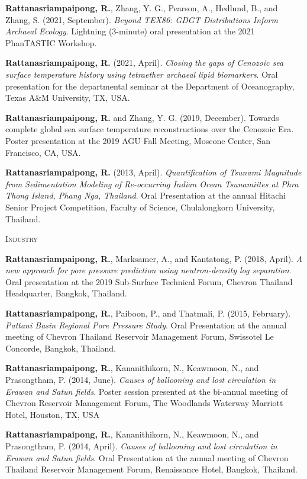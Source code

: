 \documentclass[10pt, letter]{article}
\newcommand{\myname}[1]{\textbf{Rattanasriampaipong, R.}}
\begin{document}
\begin{etaremune}
\item {\myname{rattanasriampaipong}}, Zhang, Y. G., Pearson, A., Hedlund, B., and Zhang, S. (2021, September). \textit{Beyond TEX86: GDGT Distributions Inform Archaeal Ecology}. Lightning (3-minute) oral presentation at the 2021 PhanTASTIC Workshop.

\item {\myname{rattanasriampaipong}} (2021, April). \textit{Closing the gaps of Cenozoic sea surface temperature history using tetraether archaeal lipid biomarkers}. Oral presentation for the departmental seminar at the Department of Oceanography, Texas A\&M University, TX, USA.

\item {\myname{rattanasriampaipong}} and Zhang, Y. G. (2019, December). Towards complete global sea surface temperature reconstructions over the Cenozoic Era. Poster presentation at the 2019 AGU Fall Meeting, Moscone Center, San Francisco, CA, USA.

\item {\myname{rattanasriampaipong}} (2013, April). \textit{Quantification of Tsunami Magnitude from Sedimentation Modeling of Re-occurring Indian Ocean Tsunamiites at Phra Thong Island, Phang Nga, Thailand}. Oral Presentation at the annual Hitachi Senior Project Competition, Faculty of Science, Chulalongkorn University, Thailand.
\end{etaremune}

\bigskip
\textsc{Industry}
\begin{etaremune}
\item {\myname{rattanasriampaipong}},  Marksamer, A., and Kantatong, P. (2018, April). \textit{A new approach for pore pressure prediction using neutron-density log separation}. Oral presentation at the 2019 Sub-Surface Technical Forum, Chevron Thailand Headquarter, Bangkok, Thailand.

\item {\myname{rattanasriampaipong}}, Paiboon, P., and Thatmali, P. (2015, February). \textit{Pattani Basin Regional Pore Pressure Study}. Oral Presentation at the annual meeting of Chevron Thailand Reservoir Management Forum, Swissotel Le Concorde, Bangkok, Thailand.

\item {\myname{rattanasriampaipong}}, Kananithikorn, N., Keawmoon, N., and Prasongtham, P. (2014, June). \textit{Causes of ballooning and lost circulation in Erawan and Satun fields}. Poster session presented at the bi-annual meeting of Chevron Reservoir Management Forum, The Woodlands Waterway Marriott Hotel, Houston, TX, USA
\item {\myname{rattanasriampaipong}}, Kananithikorn, N., Keawmoon, N., and Prasongtham, P. (2014, April). 
\textit{Causes of ballooning and lost circulation in Erawan and Satun fields}. Oral Presentation at the annual meeting of Chevron Thailand Reservoir Management Forum, Renaissance Hotel, Bangkok, Thailand.

\end{etaremune}
\end{document}
